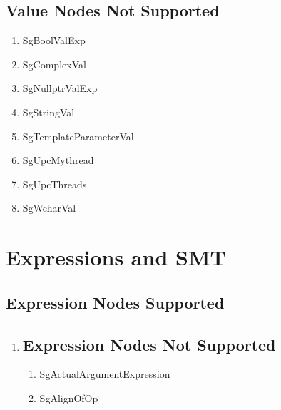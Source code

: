 \documentclass[11pt]{article}
\begin{document}
{\begin{enumeration}
\subsection{Value Nodes Not Supported}
\begin{enumerate}
\item SgBoolValExp
\item SgComplexVal
\item SgNullptrValExp
\item SgStringVal
\item SgTemplateParameterVal
\item SgUpcMythread
\item SgUpcThreads
\item SgWcharVal
\end{enumerate}
\section{Expressions and SMT}
\subsection{Expression Nodes Supported}
\begin{enumerate}
\item 

\subsection{Expression Nodes Not Supported}
\begin{enumerate}
\item SgActualArgumentExpression
\item SgAlignOfOp



\end{enumerate}
\end{enumerate}
\end{enumeration}}
\end{document}
